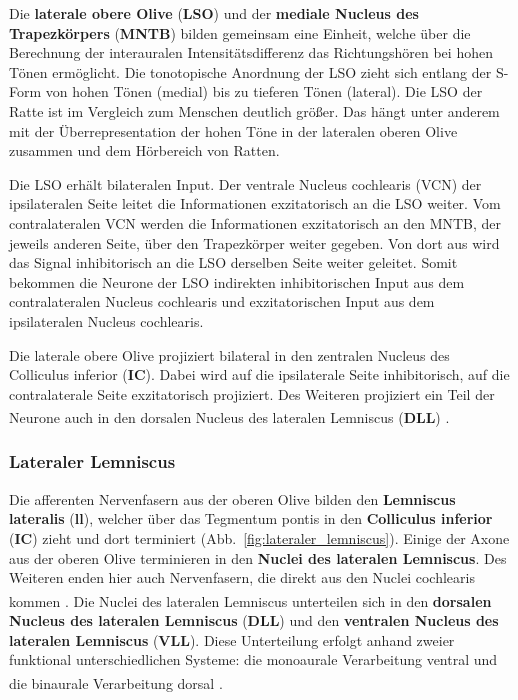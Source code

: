 \documentclass[12pt,a4paper,pdftex]{article}
\begin{document}
Die \textbf{laterale obere Olive} (\textbf{LSO}) und der \textbf{mediale Nucleus des Trapezkörpers} (\textbf{MNTB})  bilden gemeinsam eine Einheit, welche über die Berechnung der interauralen Intensitätsdifferenz das Richtungshören bei hohen Tönen ermöglicht. 
Die tonotopische Anordnung der LSO zieht sich entlang der S-Form von hohen Tönen (medial) bis zu tieferen Tönen (lateral). Die LSO der Ratte ist im Vergleich zum Menschen deutlich größer. Das hängt unter anderem mit der Überrepresentation der hohen Töne in der lateralen oberen Olive zusammen und dem Hörbereich von Ratten.

Die LSO erhält bilateralen Input. Der ventrale Nucleus cochlearis (VCN) der ipsilateralen Seite leitet die Informationen exzitatorisch an die LSO weiter. Vom contralateralen VCN werden die Informationen exzitatorisch an den MNTB, der jeweils anderen Seite, über den Trapezkörper weiter gegeben. Von dort aus wird das Signal inhibitorisch an die LSO derselben Seite weiter geleitet.
Somit bekommen die Neurone der LSO indirekten inhibitorischen Input aus dem contralateralen Nucleus cochlearis und exzitatorischen Input aus dem ipsilateralen Nucleus cochlearis.

Die laterale obere Olive projiziert bilateral in den zentralen Nucleus des Colliculus inferior (\textbf{IC}). Dabei wird auf die ipsilaterale Seite inhibitorisch, auf die contralaterale Seite exzitatorisch projiziert.
Des Weiteren projiziert ein Teil der Neurone auch in den dorsalen Nucleus des lateralen Lemniscus (\textbf{DLL}) \textsuperscript{\cite[29]{paxinos2014rat}}.


\subsubsection*{Lateraler Lemniscus}
Die afferenten Nervenfasern aus der oberen Olive bilden den \textbf{Lemniscus lateralis} (\textbf{ll}), welcher über das Tegmentum pontis in den \textbf{Colliculus inferior} (\textbf{IC})  zieht und dort terminiert (Abb.~\ref{fig:lateraler_lemniscus}). Einige der Axone aus der oberen Olive terminieren in den \textbf{Nuclei des lateralen Lemniscus}. Des Weiteren enden hier auch Nervenfasern, die direkt aus den Nuclei cochlearis kommen \textsuperscript{\cite[10]{crossman2014neuroanatomy}}. 
Die Nuclei des lateralen Lemniscus unterteilen sich in den \textbf{dorsalen Nucleus des lateralen Lemniscus} (\textbf{DLL})  und den \textbf{ventralen Nucleus des lateralen Lemniscus} (\textbf{VLL}).  Diese Unterteilung erfolgt anhand zweier funktional unterschiedlichen Systeme: die monoaurale Verarbeitung ventral und die binaurale Verarbeitung dorsal \textsuperscript{\cite[29]{paxinos2014rat}}. 
\\
\end{document}
